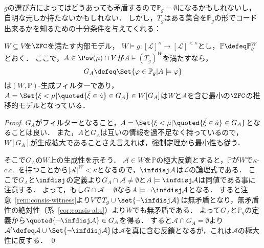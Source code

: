 \documentclass[a4j,leqno]{ltjsarticle}
\newcommand{\cc}{c.c.\ }
\begin{document}
$g$の選び方によってはどうあっても矛盾するので$\mathbb{P}_g = \emptyset$になるかもしれないし，自明な元しか持たないかもしれない．
しかし，$T_g$はある集合を$\mathbb{P}_g$の形でコード出来るかを知るための十分条件を与えてくれる：
\begin{lemma}\label{lem:GA-code-suff}
 $W \subseteq V$を$\ZFC$を満たす内部モデル， $W \models g: [\mathcal{L}]^\kappa \to [\mathcal{L}]^{<\kappa}$とし，$\mathbb{P} \defeq \mathbb{P}_g^W$とおく．
 ここで，$A \in \Pow(\mu) \cap V$が$A \models (T_g)^W$を満たすなら，
 \[
  G_A \defeq \Set{\varphi \in \mathbb{P}_g | A \models \varphi}
 \]
 は$(W, \mathbb{P})$-生成フィルターであり，$A = \Set{\xi < \mu | \quoted{\check{\xi} \in \dot{a}} \in G_A} \in W[G_A]$は$W$と$A$を含む最小の$\ZFC$の推移的モデルとなっている．
\end{lemma}
\begin{proof}
 $G_A$がフィルターとなること，$A = \Set{ \xi < \mu | \quoted{\check{\xi} \in \dot{a}} \in G_A}$となることは良い．
 また，$A$と$G_A$は互いの情報を過不足なく持っているので，$W[G_A]$が生成拡大であることさえ言えれば，強制定理から最小性も従う．

 そこで$G_A$の$W$上の生成性を示そう．
 $\mathcal{A} \in W$を$\mathbb{P}$の極大反鎖とすると，$\mathbb{P}$が$W$で$\kappa$-\cc{}を持つことから$|\mathcal{A}|^W < \kappa$となるので，$\infdisj \mathcal{A}$は$\mathcal{L}$の論理式である．
 ここで$G_A$と${\infdisj}$の定義より$G_A \cap \mathcal{A} \neq \emptyset$と$A \models \infdisj \mathcal{A}$は同値である事に注意する．
 よって，もし$G \cap \mathcal{A} = \emptyset$なら$A \models \neg \infdisj \mathcal{A}$となる．
 すると注意~\ref{rem:consis-witness}より$V$で$T_g \cup \set{\neg \infdisj \mathcal{A}}$は無矛盾となり，無矛盾性の絶対性（系~\ref{cor:consis-abs}）より$W$でも無矛盾である．
 よって$G_A$と$\mathbb{P}_g$の定義から$\quoted{\neg \infdisj\mathcal{A}} \in G_A$を得る．
 すると$\mathcal{A} \cap G_A = \emptyset$より$\mathcal{A}' \defeq \mathcal{A} \cup \Set{\neg \infdisj \mathcal{A}}$は$\mathcal{A}$を真に含む反鎖となるが，これは$\mathcal{A}$の極大性に反する． \qed
\end{proof}
\end{document}
